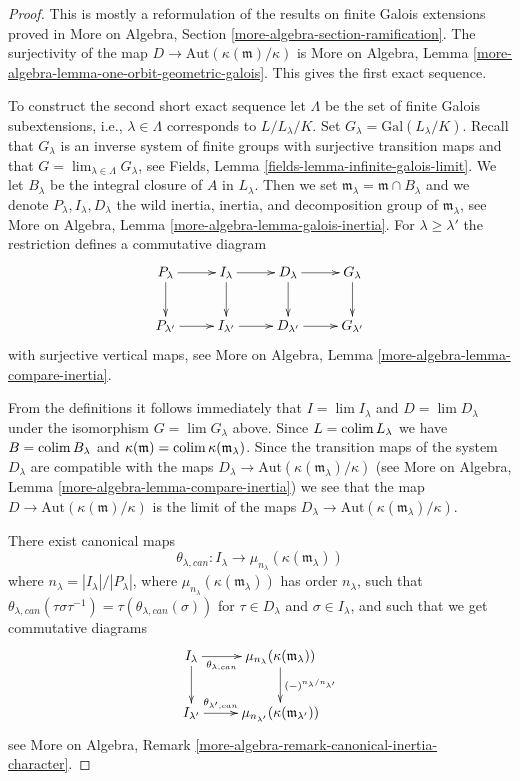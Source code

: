 \begin{proof}
This is mostly a reformulation of the results on finite Galois extensions
proved in More on Algebra, Section \ref{more-algebra-section-ramification}.
The surjectivity of the map $D \to \text{Aut}(\kappa(\mathfrak m)/\kappa)$ is
More on Algebra, Lemma \ref{more-algebra-lemma-one-orbit-geometric-galois}.
This gives the first exact sequence.

\medskip\noindent
To construct the second short exact sequence let $\Lambda$ be the set
of finite Galois subextensions, i.e., $\lambda \in \Lambda$ corresponds
to $L/L_\lambda/K$. Set $G_\lambda = \text{Gal}(L_\lambda/K)$.
Recall that $G_\lambda$ is an inverse system of finite groups with surjective
transition maps and that $G = \lim_{\lambda \in \Lambda} G_\lambda$, see
Fields, Lemma \ref{fields-lemma-infinite-galois-limit}.
We let $B_\lambda$ be the integral closure of $A$ in $L_\lambda$.
Then we set $\mathfrak m_\lambda = \mathfrak m \cap B_\lambda$
and we denote $P_\lambda, I_\lambda, D_\lambda$ the
wild inertia, inertia, and decomposition group of
$\mathfrak m_\lambda$, see More on Algebra, Lemma
\ref{more-algebra-lemma-galois-inertia}.
For $\lambda \geq \lambda'$ the restriction defines
a commutative diagram
$$
\xymatrix{
P_\lambda \ar[d] \ar[r] &
I_\lambda \ar[d] \ar[r] &
D_\lambda \ar[d] \ar[r] &
G_\lambda \ar[d] \\
P_{\lambda'} \ar[r] &
I_{\lambda'} \ar[r] &
D_{\lambda'} \ar[r] &
G_{\lambda'}
}
$$
with surjective vertical maps, see
More on Algebra, Lemma \ref{more-algebra-lemma-compare-inertia}.

\medskip\noindent
From the definitions it follows immediately
that $I = \lim I_\lambda$ and $D = \lim D_\lambda$
under the isomorphism $G = \lim G_\lambda$ above.
Since $L = \mathop{\mathrm{colim}}\nolimits L_\lambda$ we have $B = \mathop{\mathrm{colim}}\nolimits B_\lambda$
and $\kappa(\mathfrak m) = \mathop{\mathrm{colim}}\nolimits \kappa(\mathfrak m_\lambda)$.
Since the transition maps of the system $D_\lambda$
are compatible with the maps
$D_\lambda \to \text{Aut}(\kappa(\mathfrak m_\lambda)/\kappa)$
(see More on Algebra, Lemma \ref{more-algebra-lemma-compare-inertia})
we see that the map $D \to \text{Aut}(\kappa(\mathfrak m)/\kappa)$
is the limit of the maps
$D_\lambda \to \text{Aut}(\kappa(\mathfrak m_\lambda)/\kappa)$.

\medskip\noindent
There exist canonical maps
$$
\theta_{\lambda, can} :
I_\lambda
\longrightarrow
\mu_{n_\lambda}(\kappa(\mathfrak m_\lambda))
$$
where $n_\lambda = |I_\lambda|/|P_\lambda|$, where
$\mu_{n_\lambda}(\kappa(\mathfrak m_\lambda))$ has
order $n_\lambda$, such that
$\theta_{\lambda, can}(\tau \sigma \tau^{-1}) =
\tau(\theta_{\lambda, can}(\sigma))$ for
$\tau \in D_\lambda$ and $\sigma \in I_\lambda$, and such that
we get commutative diagrams
$$
\xymatrix{
I_\lambda \ar[r]_-{\theta_{\lambda, can}} \ar[d] &
\mu_{n_\lambda}(\kappa(\mathfrak m_\lambda))
\ar[d]^{(-)^{n_\lambda/n_{\lambda'}}} \\
I_{\lambda'} \ar[r]^-{\theta_{\lambda', can}} &
\mu_{n_{\lambda'}}(\kappa(\mathfrak m_{\lambda'}))
}
$$
see
More on Algebra, Remark \ref{more-algebra-remark-canonical-inertia-character}.


\end{proof}

